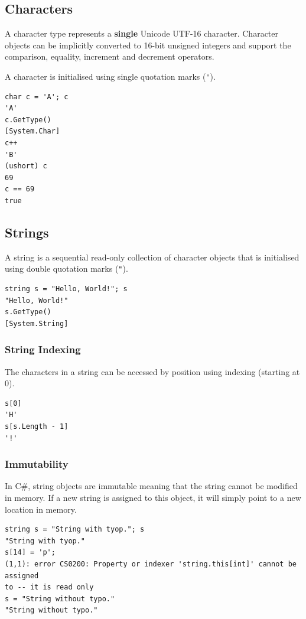\documentclass{article}
\def\customlinemarker#1#2{
    \edef\thelstnumber{%
        \unexpanded{%
            \ifnum#1=\value{lstnumber}\relax
              #2%
            \fi}%
        \ifx\thelstnumber\relax\else
        \expandafter\unexpanded\expandafter{\thelstnumber}%
        \fi
    }
}
\begin{document}
\subsection{Characters}
A character type represents a \textbf{single} Unicode UTF-16 character.
Character objects can be implicitly converted to 16-bit unsigned integers and
support the comparison, equality, increment and decrement operators.

A character is initialised using single quotation marks (\lstinline{'}). %
\begingroup
\let\thelstnumber\relax
\customlinemarker{1}{\$}
\customlinemarker{3}{\$}
\customlinemarker{5}{\$}
\customlinemarker{7}{\$}
\customlinemarker{9}{\$}
\begin{lstlisting}
char c = 'A'; c
'A'
c.GetType()
[System.Char]
c++
'B'
(ushort) c
69
c == 69
true
\end{lstlisting}
\endgroup
\subsection{Strings}
A string is a sequential read-only collection of character objects that
is initialised using double quotation marks (\lstinline{"}). %
\begingroup
\let\thelstnumber\relax
\customlinemarker{1}{\$}
\customlinemarker{3}{\$}
\begin{lstlisting}
string s = "Hello, World!"; s
"Hello, World!"
s.GetType()
[System.String]
\end{lstlisting}
\endgroup
\subsubsection{String Indexing}
The characters in a string can be accessed by position using indexing (starting at 0).
\begingroup
\let\thelstnumber\relax
\customlinemarker{1}{\$}
\customlinemarker{3}{\$}
\begin{lstlisting}
s[0]
'H'
s[s.Length - 1]
'!'
\end{lstlisting}
\endgroup
\subsubsection{Immutability}
In C\#, string objects are immutable meaning that the string cannot be modified in memory. If a new string is assigned
to this object, it will simply point to a new location in memory.
\begingroup
\let\thelstnumber\relax
\customlinemarker{1}{\$}
\customlinemarker{3}{\$}
\customlinemarker{6}{\$}
\begin{lstlisting}
string s = "String with tyop."; s
"String with tyop."
s[14] = 'p';
(1,1): error CS0200: Property or indexer 'string.this[int]' cannot be assigned 
to -- it is read only
s = "String without typo."
"String without typo."
\end{lstlisting}
\endgroup
\end{document}
